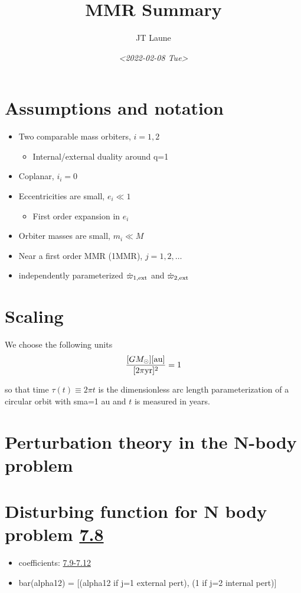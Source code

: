 \documentclass[11pt]{article}
\author{JT Laune}
\date{\textit{<2022-02-08 Tue>}}
\title{MMR Summary}
\begin{document}
\maketitle

\section{Assumptions and notation}
\label{sec:org60efc5e}
\begin{itemize}
\item Two comparable mass orbiters, \(i=1,2\)
\begin{itemize}
\item Internal/external duality around q=1
\end{itemize}
\item Coplanar, \(i_i=0\)
\item Eccentricities are small, \(e_i\ll 1\)
\begin{itemize}
\item First order expansion in \(e_i\)
\end{itemize}
\item Orbiter masses are small, \(m_i\ll M\)
\item Near a first order MMR (1MMR), \(j = 1, 2, \ldots\)
\item independently parameterized \(\dot\varpi_{1,\rm ext}\) and \(\dot\varpi_{2,\rm ext}\)
\end{itemize}

\section{Scaling}
\label{sec:org463d5ca}
We choose the following units
\begin{align}
\frac{[GM_\odot][{\rm au}]}{[2\pi{\rm yr}]^2} = 1
\end{align}

\noindent so that time \(\tau(t) \equiv 2\pi t\) is the
dimensionless arc length parameterization of a circular orbit
with sma=1 au and \(t\) is measured in years.

\section{Perturbation theory in the N-body problem}
\label{sec:org039a230}
\section{Disturbing function for N body problem \href{./images/screenshot-02.png}{7.8}}
\label{sec:org965460f}
\begin{itemize}
\item coefficients: \href{./images/screenshot-03.png}{7.9-7.12}
\item bar(alpha12) = [(alpha12 if j=1 external pert),  (1 if j=2 internal pert)]
\end{itemize}
\end{document}
